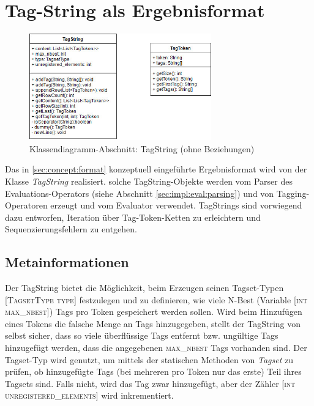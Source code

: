 \section{Tag-String als Ergebnisformat}
\label{sec:impl:tagstring}

\begin{figure}[htb]
	\centering
	\captionsetup{justification=centering,margin=2cm}
	\includegraphics[width=0.7\textwidth]{gfx/tagstring_uml.jpg}
	
	\caption{Klassendiagramm-Abschnitt: TagString (ohne Beziehungen)} 
	\label{fig:impl:tagstring:uml}
\end{figure}

Das in \ref{sec:concept:format} konzeptuell eingeführte Ergebnisformat wird von der Klasse \textit{TagString} realisiert. solche TagString-Objekte werden vom Parser des Evaluations-Operators (siehe Abschnitt \ref{sec:impl:eval:parsing}) und von Tagging-Operatoren erzeugt und vom Evaluator verwendet. TagStrings sind vorwiegend dazu entworfen, Iteration über Tag-Token-Ketten zu erleichtern und Sequenzierungsfehlern zu entgehen.

\subsection{Metainformationen}
Der TagString bietet die Möglichkeit, beim Erzeugen seinen Tagset-Typen \textsc{[TagsetType type]} festzulegen und zu definieren, wie viele N-Best (Variable \textsc{[int max\_nbest]}) Tags pro Token gespeichert werden sollen. Wird beim Hinzufügen eines Tokens die falsche Menge an Tags hinzugegeben, stellt der TagString von selbst sicher, dass so viele überflüssige Tags entfernt bzw. ungültige Tags hinzugefügt werden, dass die angegebenen \textsc{max\_nbest} Tags vorhanden sind. Der Tagset-Typ wird genutzt, um mittels der statischen Methoden von \textit{Tagset} zu prüfen, ob hinzugefügte Tags (bei mehreren pro Token nur das erste) Teil ihres Tagsets sind. Falls nicht, wird das Tag zwar hinzugefügt, aber der Zähler \textsc{[int unregistered\_elements]} wird inkrementiert.
